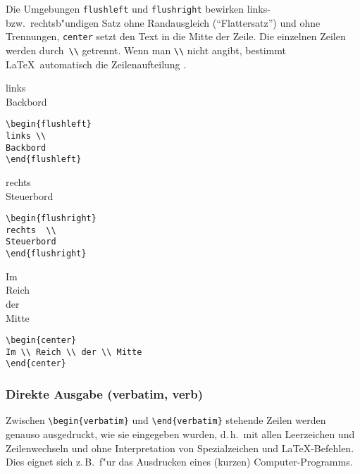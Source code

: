 Die Umgebungen \texttt{flushleft} und \texttt{flushright}
bewirken links- bzw.\ rechts\-b"undigen Satz ohne Randausgleich 
("`Flattersatz"') und ohne Trennungen, 
\texttt{center} setzt den Text in
die Mitte der Zeile.
Die einzelnen Zeilen werden durch~\verb|\\| getrennt.
Wenn man \verb|\\| nicht angibt, bestimmt \LaTeX\ automatisch die
Zeilenaufteilung%
.
\exa
\begin{flushleft}
links \\
Backbord
\end{flushleft}
\exb
\begin{verbatim}
\begin{flushleft}
links \\
Backbord
\end{flushleft}
\end{verbatim}
\exc
\exa
\begin{flushright}
rechts  \\
Steuerbord
\end{flushright}
\exb
\begin{verbatim}
\begin{flushright}
rechts  \\
Steuerbord
\end{flushright}
\end{verbatim}
\exc
\exa
\begin{center}
Im \\ Reich \\ der \\ Mitte
\end{center}
\exb
\begin{verbatim}
\begin{center}
Im \\ Reich \\ der \\ Mitte
\end{center}
\end{verbatim}
\exc


\subsubsection{Direkte Ausgabe (verbatim, verb)}
 
Zwischen \verb|\begin{verbatim}| und \verb|\end{verbatim}|
stehende Zeilen werden genauso ausgedruckt, wie sie eingegeben
wurden, d.\,h.\ mit allen Leerzeichen und Zeilenwechseln und ohne
Interpretation von Spezialzeichen und \LaTeX-Befehlen.  Dies
eignet sich z.\,B.\ f"ur das Ausdrucken eines (kurzen)
Computer-Programms.

